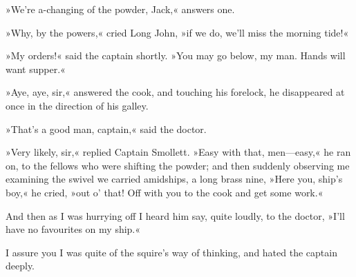 »We're a-changing of the powder, Jack,« answers one.

»Why, by the powers,« cried Long John, »if we do, we'll miss the morning tide!«

»My orders!« said the captain shortly. »You may go below, my man. Hands will want supper.«

»Aye, aye, sir,« answered the cook, and touching his forelock, he disappeared at once in the direction of his galley.

»That's a good man, captain,« said the doctor.

»Very likely, sir,« replied Captain Smollett. »Easy with that, men—easy,« he ran on, to the fellows who were shifting the powder; and then suddenly observing me examining the swivel we carried amidships, a long brass nine, »Here you, ship's boy,« he cried, »out o' that! Off with you to the cook and get some work.«


And then as I was hurrying off I heard him say, quite loudly, to the doctor, »I'll have no favourites on my ship.«

I assure you I was quite of the squire's way of thinking, and hated the captain deeply.